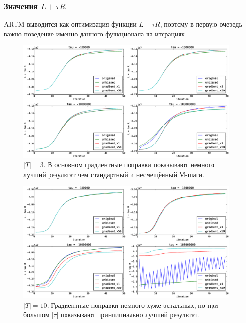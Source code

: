 \documentclass[12pt]{article}
\begin{document}
\subsubsection{Значения $L + \tau R$}
ARTM выводится как оптимизация функции $L + \tau R$, поэтому в первую очередь важно поведение именно данного функционала на итерациях.\\
\begin{figure}[H]
	\centering
	\caption{$|T| = 3$. В основном градиентные поправки показывают немного лучший результат чем стандартный и несмещённый М-шаги. }   
	\medskip   
	\includegraphics[width=1.0\linewidth]{pictures/topics_3_LR_values}
\end{figure}
\begin{figure}[H]
	\centering
	\caption{$|T| = 10$. Градиентные поправки немного хуже остальных, но при большом $|\tau|$ показывают принципиально лучший результат.}      
	\medskip
	\includegraphics[width=1.0\linewidth]{pictures/topics_10_LR_values}
\end{figure}
\end{document}
